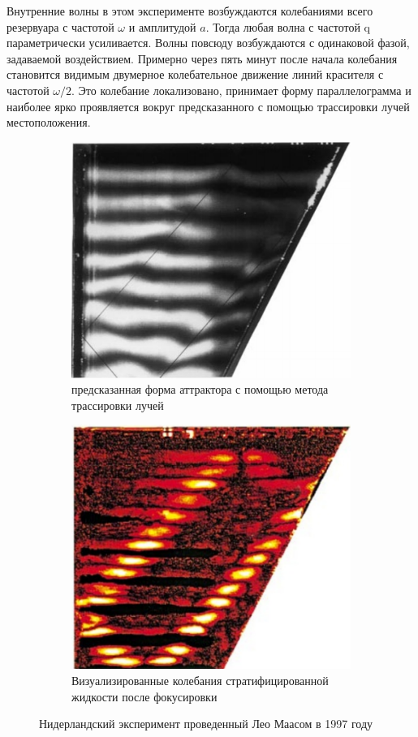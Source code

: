 Внутренние волны в этом эксперименте возбуждаются колебаниями всего резервуара с частотой $\omega$ и амплитудой $a$. Тогда любая волна с частотой q параметрически усиливается. Волны повсюду возбуждаются с одинаковой фазой, задаваемой воздействием. Примерно через пять минут после начала колебания становится видимым двумерное колебательное движение линий красителя с частотой $\omega / 2$. Это колебание локализовано, принимает форму параллелограмма и наиболее ярко проявляется вокруг предсказанного с помощью трассировки лучей местоположения. 

\begin{figure}
    \centering
    \begin{subfigure}[t]{0.45\textwidth}
        \centering
        \includegraphics[scale=0.6]{pics/Exp1997Maas.png}
        \caption{предсказанная форма аттрактора с помощью метода трассировки лучей}
        \label{fig:maasExperA}
    \end{subfigure}
    \begin{subfigure}[t]{0.45\textwidth}
        \centering
        \includegraphics[scale=0.67]{pics/Exp1997MaasB.png}
        \caption{Визуализированные колебания стратифицированной жидкости после фокусировки}
        \label{fig:maasExperB}
    \end{subfigure}
    \caption{Нидерландский эксперимент проведенный Лео Маасом в 1997 году \cite{Maas1997}}
    \label{fig:maasEper1997}
\end{figure}

